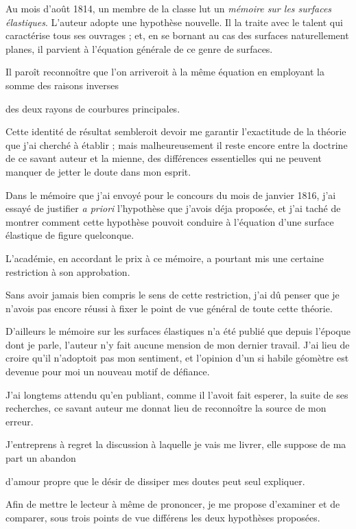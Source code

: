 \documentclass[11pt,a4paper]{article}
\begin{document}
Au mois d'août 1814, un membre de la classe lut un \emph{mémoire sur les
surfaces élastiques}. L'auteur adopte une hypothèse nouvelle. Il la traite
avec le talent qui caractérise tous ses ouvrages ; et, en se bornant au cas
des surfaces naturellement planes, il parvient à l'équation générale de ce
genre de surfaces.

Il paroît reconnoître que l'on arriveroit à la même équation en employant la
somme des raisons inverses

des deux rayons de courbures principales.

Cette identité de résultat sembleroit devoir me garantir l'exactitude de la
théorie que j'ai cherché à établir ; mais malheureusement il reste encore
entre la doctrine de ce savant auteur et la mienne, des différences
essentielles qui ne peuvent manquer de jetter le doute dans mon esprit.

Dans le mémoire que j'ai envoyé pour le concours du mois de janvier 1816, j'ai
essayé de justifier \emph{a priori} l'hypothèse que j'avois déja proposée, et
j'ai taché de montrer comment cette hypothèse pouvoit conduire à l'équation
d'une surface élastique de figure quelconque.

L'académie, en accordant le prix à ce mémoire, a pourtant mis une certaine
restriction à son approbation.

Sans avoir jamais bien compris le sens de cette restriction, j'ai dû penser
que je n'avois pas encore réussi à fixer le point de vue général de toute
cette théorie.

D'ailleurs le mémoire sur les surfaces élastiques n'a été publié que depuis
l'époque dont je parle, l'auteur n'y fait aucune mension de mon dernier
travail. J'ai lieu de croire qu'il n'adoptoit pas mon sentiment, et l'opinion
d'un si habile géomètre est devenue pour moi un nouveau motif de défiance.

J'ai longtems attendu qu'en publiant, comme il l'avoit fait esperer, la suite
de ses recherches, ce savant auteur me donnat lieu de reconnoître la source de
mon erreur.

J'entreprens à regret la discussion à laquelle je vais me livrer, elle suppose
de ma part un abandon

d'amour propre que le désir de dissiper mes doutes peut seul expliquer.

Afin de mettre le lecteur à même de prononcer, je me propose d'examiner et de
comparer, sous trois points de vue différens les deux hypothèses proposées.
\end{document}
